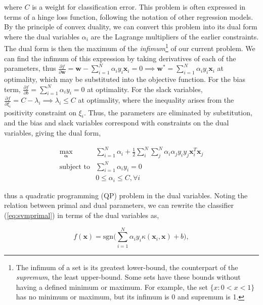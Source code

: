 \documentclass[11pt]{amsart}
\begin{document}
where $C$ is a weight for classification error. This problem is often expressed in terms of a hinge loss function, following the notation of other regression models. By the principle of convex duality, we can convert this problem into its dual form where the dual variables $\alpha_i$ are the Lagrange multipliers of the earlier constraints. The dual form is then the maximum of the \emph{infimum}\footnote{The infimum of a set is its greatest lower-bound, the counterpart of the \emph{supremum}, the least upper-bound. Some sets have these bounds without having a defined minimum or maximum. For example, the set $\{x : 0 < x < 1\}$ has no minimum or maximum, but its infimum is 0 and supremum is 1.}  of our current problem. We can find the infimum of this expression by taking derivatives of each of the parameters, thus $\frac{\partial f}{\partial \mathbf{w}} = \mathbf{w} - \sum_{i=1}^N \alpha_iy_i\mathbf{x}_i = 0 \implies \mathbf{w}^* = \sum_{i=1}^N \alpha_iy_i\mathbf{x}_i$ at optimality, which may be substituted into the objective function. For the bias term, $\frac{\partial f}{\partial b} = \sum_{i=1}^N \alpha_iy_i = 0$ at optimality. For the slack variables, 
$\frac{\partial f}{\partial\xi_i} = C - \lambda_i \implies \lambda_i \leq C$ at optimality, where the inequality arises from the positivity constraint on $\xi_i$. Thus, the parameters are eliminated by substitution, and the bias and slack variables correspond with constraints on the dual variables, giving the dual form,

\begin{equation}
\begin{array}{rl}
\max_{\boldsymbol\alpha} & \sum_{i = 1}^{N}\alpha_i + \frac{1}{2}\sum_{i}^N\sum_{j}^N \alpha_i\alpha_jy_iy_j\mathbf{x}_i^T\mathbf{x}_j \\
\text{subject to} & \sum_{i=1}^N \alpha_iy_i = 0 \\
& 0 \leq \alpha_i \leq C, \forall i
\end{array}
\label{eq:dual}
\end{equation}

thus a quadratic programming (QP) problem in the dual variables. Noting the relation between primal and dual parameters, we can rewrite the classifier (\ref{eq:svmprimal}) in terms of the dual variables as,

\begin{equation}
f(\mathbf{x}) = \text{sgn}\Bigg(\sum_{i=1}^N \alpha_iy_i\kappa(\mathbf{x}_i, \mathbf{x}) + b\Bigg),
\label{eq:svmdual}
\end{equation}
\end{document}
